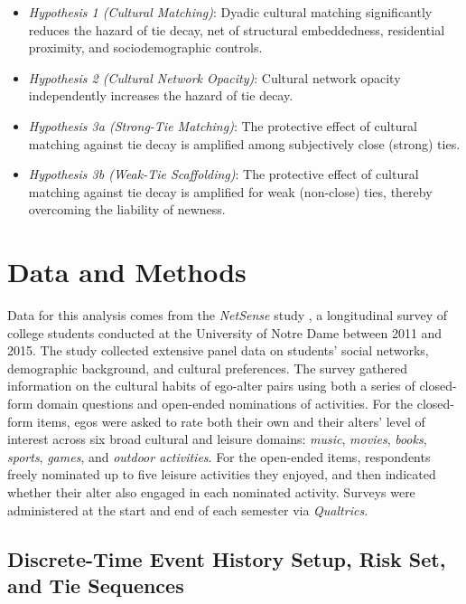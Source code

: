 \documentclass[12pt,letterpaper]{article}
\begin{document}
\begin{itemize}
\item \textit{Hypothesis 1 (Cultural Matching)}: Dyadic cultural matching significantly reduces the hazard of tie decay, net of structural embeddedness, residential proximity, and sociodemographic controls.
\item \textit{Hypothesis 2 (Cultural Network Opacity)}: Cultural network opacity independently increases the hazard of tie decay.
\item \textit{Hypothesis 3a (Strong-Tie Matching)}: The protective effect of cultural matching against tie decay is amplified among subjectively close (strong) ties.
\item \textit{Hypothesis 3b (Weak-Tie Scaffolding)}: The protective effect of cultural matching against tie decay is amplified for weak (non-close) ties, thereby overcoming the liability of newness.
\end{itemize}

\section{Data and Methods}\label{data-and-methods}

Data for this analysis comes from the \textit{NetSense} study \citep{striegel2013lessons-595}, a longitudinal survey of college students conducted at the University of Notre Dame between 2011 and 2015. The study collected extensive panel data on students' social networks, demographic background, and cultural preferences. The survey gathered information on the cultural habits of ego-alter pairs using both a series of closed-form domain questions and open-ended nominations of activities. For the closed-form items, egos were asked to rate both their own and their alters' level of interest across six broad cultural and leisure domains: \textit{music}, \textit{movies}, \textit{books}, \textit{sports}, \textit{games}, and \textit{outdoor activities}. For the open-ended items, respondents freely nominated up to five leisure activities they enjoyed, and then indicated whether their alter also engaged in each nominated activity. Surveys were administered at the start and end of each semester via \textit{Qualtrics}.


\subsection{Discrete-Time Event History Setup, Risk Set, and Tie Sequences}\label{study-waves}
\end{document}

